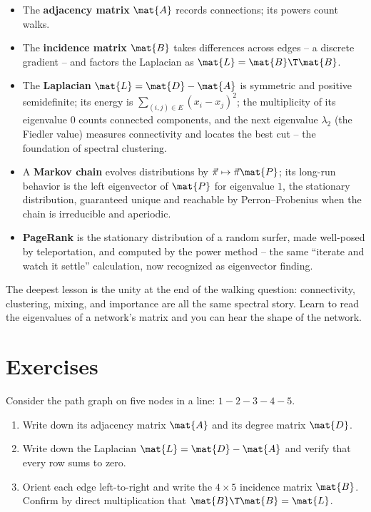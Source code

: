 \begin{itemize}
\item The \textbf{adjacency matrix} $\mat{A}$ records connections; its powers count walks.
\item The \textbf{incidence matrix} $\mat{B}$ takes differences across edges -- a discrete
gradient -- and factors the Laplacian as $\mat{L} = \mat{B}\T\mat{B}$.
\item The \textbf{Laplacian} $\mat{L} = \mat{D}-\mat{A}$ is symmetric and positive
semidefinite; its energy is $\sum_{(i,j)\in E}(x_i-x_j)^2$; the multiplicity of its
eigenvalue $0$ counts connected components, and the next eigenvalue $\lambda_2$ (the Fiedler
value) measures connectivity and locates the best cut -- the foundation of spectral
clustering.
\item A \textbf{Markov chain} evolves distributions by $\vec\pi \mapsto \vec\pi\mat{P}$; its
long-run behavior is the left eigenvector of $\mat{P}$ for eigenvalue $1$, the stationary
distribution, guaranteed unique and reachable by Perron--Frobenius when the chain is
irreducible and aperiodic.
\item \textbf{PageRank} is the stationary distribution of a random surfer, made well-posed
by teleportation, and computed by the power method -- the same ``iterate and watch it
settle'' calculation, now recognized as eigenvector finding.
\end{itemize}

The deepest lesson is the unity at the end of the walking question: connectivity, clustering,
mixing, and importance are all the same spectral story. Learn to read the eigenvalues of a
network's matrix and you can hear the shape of the network.

\section*{Exercises}

\begin{exercise}
\label{ch35:ex-build}
Consider the path graph on five nodes in a line: $1\!-\!2\!-\!3\!-\!4\!-\!5$.
\begin{enumerate}
\item Write down its adjacency matrix $\mat{A}$ and its degree matrix $\mat{D}$.
\item Write down the Laplacian $\mat{L} = \mat{D}-\mat{A}$ and verify that every row sums to
zero.
\item Orient each edge left-to-right and write the $4\times 5$ incidence matrix $\mat{B}$.
Confirm by direct multiplication that $\mat{B}\T\mat{B} = \mat{L}$.
\end{enumerate}
\end{exercise}

